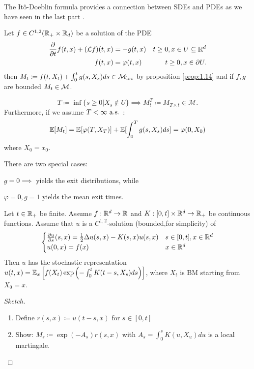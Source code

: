 \begin{remark}
   The Itô-Doeblin formula provides a connection between SDEs and PDEs as we 
   have seen in the last part . 
\end{remark}

\begin{example}\label{ex:1.15}
    Let $f\in C^{1,2}(\mathbb{R}_+\times \mathbb{R}_d)$ be a solution of the PDE 
    \begin{align*}
        \frac{\partial}{\partial t}f(t,x)+(\mathcal{L}f)(t,x)&=-g(t,x) & t\geq 0, x\in U\subseteq \mathbb{R}^d\\
        f(t,x)&=\varphi(t,x) & t\geq 0,x\in\partial U.
    \end{align*}
    then $M_t\coloneqq f(t,X_t)+\int_0^t g(s,X_s)ds\in\mathcal{M}_{\text{loc}}$ by proposition \ref{prop:1.14}
    and if $f,g$ are bounded $M_t\in\mathcal{M}$.

    \[T\coloneqq \inf\{s\geq 0|X_s\notin U\}\implies M_t^T\coloneqq M_{T\land t}\in \mathcal{M}.\]
    Furthermore, if we assume $T<\infty\text{ a.s. }$:
    \[\mathbb{E}[M_t]=\mathbb{E}[\varphi(T,X_T)]+\mathbb{E}[\int_0^Tg(s,X_s)ds]=\varphi(0,X_0)\]
    where $X_0=x_0$.

    There are two special cases:

    $g=0\implies$ yields the exit distributions, while 
    
    $\varphi=0,g=1$ yields the mean exit times.
\end{example}

\begin{example}\label{ex1.16:feynman-kac}
    Let $t\in\mathbb{R}_+$ be finite. Assume $f:\mathbb{R}^d\to\mathbb{R}$ and $K:[0,t]\times\mathbb{R}^d\to\mathbb{R}_+$ 
    be continuous functions. Assume that $u$ is a $C^{1,2}$-solution (bounded,for simplicity) of 
    \[\begin{cases}
        \frac{\partial u}{\partial s}(s,x)=\frac{1}{2}\Delta u(s,x)-K(s,x)u(s,x) & s\in [0,t],x\in\mathbb{R}^d\\
        u(0,x)=f(x)& x\in\mathbb{R}^d
    \end{cases}\]
    Then $u$ has the stochastic representation $u(t,x)=\mathbb{E}_x\left[f(X_t)\exp\left(-\int_0^t K(t-s,X_s)ds\right)\right]$,
    where $X_t$ is BM starting from $X_0=x$.
\end{example}

\begin{proof}[Sketch]
    \begin{enumerate}
        \item Define $r(s,x)\coloneqq u(t-s,x)$ for $s\in[0,t]$
        \item Show: $M_s\coloneqq \exp(-A_s)r(s,x)$ with $A_s=\int_0^s K(u,X_u)du$ is a local martingale.
    \end{enumerate}
\end{proof}

